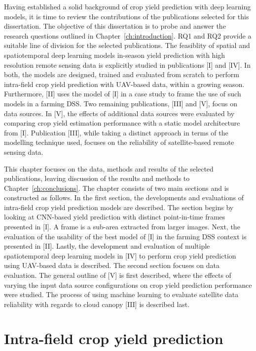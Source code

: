 Having established a solid background of crop yield prediction with deep learning models, it is time to review the contributions of the publications selected for this dissertation. The objective of this dissertation is to probe and answer the research questions outlined in Chapter~\ref{ch:introduction}. RQ1 and RQ2 provide a suitable line of division for the selected publications. The feasiblity of spatial and spatiotemporal deep learning models in-season yield prediction with high resolution remote sensing data is explicitly studied in publications [I] and [IV]. In both, the models are designed, trained and evaluated from scratch to perform intra-field crop yield prediction with UAV-based data, within a growing season. Furthermore, [II] uses the model of [I] in a case study to frame the use of such models in a farming DSS. Two remaining publications, [III] and [V], focus on data sources. In [V], the effects of additional data sources were evaluated by comparing crop yield estimation performance with a static model architecture from [I]. Publication [III], while taking a distinct approach in terms of the modelling technique used, focuses on the reliability of satellite-based remote sensing data.

This chapter focuses on the data, methods and results of the selected publications, leaving discussion of the results and methods to Chapter~\ref{ch:conclusions}. The chapter consists of two main sections and is constructed as follows. In the first section, the developments and evaluations of intra-field crop yield prediction models are described. The section begins by looking at CNN-based yield prediction with distinct point-in-time frames presented in [I]. A frame is a sub-area extracted from larger images. Next, the evaluation of the usability of the best model of [I] in the farming DSS context is presented in [II]. Lastly, the development and evaluation of multiple spatiotemporal deep learning models in [IV] to perform crop yield prediction using UAV-based data is described. The second section focuses on data evaluation. The general outline of [V] is first described, where the effects of varying the input data source configurations on crop yield prediction performance were studied. The process of using machine learning to evaluate satellite data reliability with regards to cloud canopy [III] is described last.


\section{Intra-field crop yield prediction}
\label{sec:crop-yield-prediction-results}

